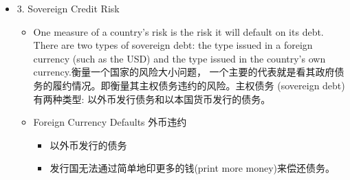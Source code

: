 \begin{itemize}
\begin{itemize}
\item The World Bank

\begin{itemize}
\item Provides country risk data measuring corruption (腐败)， government effectiveness， political stability， regulatory quality， the rule of law， and accountability.
\end{itemize}

\item 要注意这么几个问题:
\begin{itemize}

    \item 1) 几个机构之间的评分无法进行比较。It is difficult to compare these services because they use different scoring methods and consider different attributes of country risk.

    \item 2) not every dimension of country risk is necessarily relevant to every individual or corporation.

    \item 3) the question of scaling (评分的尺度问题): 如果 \(\mathrm{A}\) 国家的得分是 \(\mathrm{B}\) 国的两倍，并不意味着 \(\mathrm{A}\) 国的风险是 \(\mathrm{B}\) 国的两倍。因此，国家的得分排序 (rankings of countries)比它们分数本身(their numerical scores)更有意义。
\end{itemize}
\end{itemize}

\item 3. Sovereign Credit Risk

\begin{itemize}
\item One measure of a country's risk is the risk it will default on its debt. There are two types of sovereign debt: the type issued in a foreign currency (such as the USD) and the type issued in the country's own currency.衡量一个国家的风险大小问题， 一个主要的代表就是看其政府债务的履约情况。即衡量其主权债务违约的风险。主权债务 (sovereign debt) 有两种类型: 以外币发行债务和以本国货币发行的债务。


\item Foreign Currency Defaults 外币违约

\begin{itemize}

    \item 以外币发行的债务

    \item 发行国无法通过简单地印更多的钱(print more money)来偿还债务。


\end{itemize}
\end{itemize}
\end{itemize}
